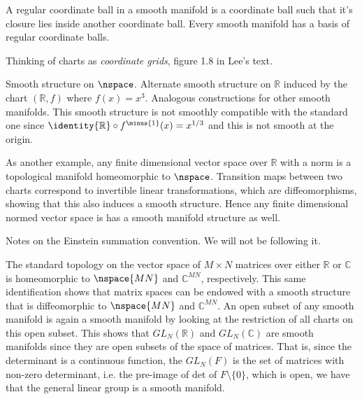     \par\hfill\par
    A regular coordinate ball in a smooth manifold is a coordinate ball such
    that it's closure lies inside another coordinate ball. Every smooth
    manifold has a basis of regular coordinate balls.
    \par\hfill\par
    Thinking of charts as \textit{coordinate grids}, figure 1.8 in Lee's text.
    \begin{example}
        Smooth structure on $\nspace$. Alternate smooth structure on
        $\mathbb{R}$ induced by the chart $(\mathbb{R},f)$ where $f(x)=x^{3}$.
        Analogous constructions for other smooth manifolds. This smooth
        structure is not smoothly compatible with the standard one since
        $\identity{\mathbb{R}}\circ{f}^{\minus{1}}(x)=x^{1/3}$ and this is not
        smooth at the origin.
    \end{example}
    As another example, any finite dimensional vector space over $\mathbb{R}$
    with a norm is a topological manifold homeomorphic to $\nspace$.
    Transition maps between two charts correspond to invertible linear
    transformations, which are diffeomorphisms, showing that this also induces
    a smooth structure. Hence any finite dimensional normed vector space is has
    a smooth manifold structure as well.
    \par\hfill\par
    Notes on the Einstein summation convention. We will not be following it.
    \par\hfill\par
    The standard topology on the vector space of $M\times{N}$ matrices over
    either $\mathbb{R}$ or $\mathbb{C}$ is homeomorphic to $\nspace{MN}$ and
    $\mathbb{C}^{MN}$, respectively. This same identification shows that matrix
    spaces can be endowed with a smooth structure that is diffeomorphic to
    $\nspace{MN}$ and $\mathbb{C}^{MN}$. An open subset of any smooth manifold
    is again a smooth manifold by looking at the restriction of all charts on
    this open subset. This shows that $GL_{N}(\mathbb{R})$ and
    $GL_{N}(\mathbb{C})$ are smooth manifolds since they are open subsets of
    the space of matrices. That is, since the determinant is a continuous
    function, the $GL_{N}(F)$ is the set of matrices with non-zero determinant,
    i.e. the pre-image of $\textrm{det}$ of $F\setminus\{0\}$, which is open,
    we have that the general linear group is a smooth manifold.